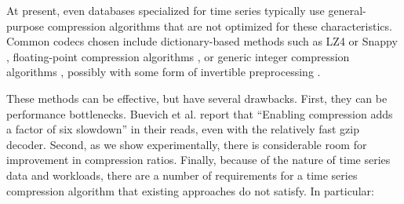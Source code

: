 
At present, even databases specialized for time series typically use general-purpose compression algorithms that are not optimized for these characteristics. Common codecs chosen include dictionary-based methods such as LZ4 \cite{lz4} or Snappy \cite{snappy}, floating-point compression algorithms \cite{gorilla}, or generic integer compression algorithms \cite{influxDB, simple8b}, possibly with some form of invertible preprocessing \cite{influxDB, gorilla, berkeleyTreeDB}.


These methods can be effective, but have several drawbacks. First, they can be performance bottlenecks. Buevich et al. report that ``Enabling compression adds a factor of six slowdown'' \cite{respawnDB} in their reads, even with the relatively fast gzip decoder. Second, as we show experimentally, there is considerable room for improvement in compression ratios. Finally, because of the nature of time series data and workloads, there are a number of requirements for a time series compression algorithm that existing approaches do not satisfy. In particular:






